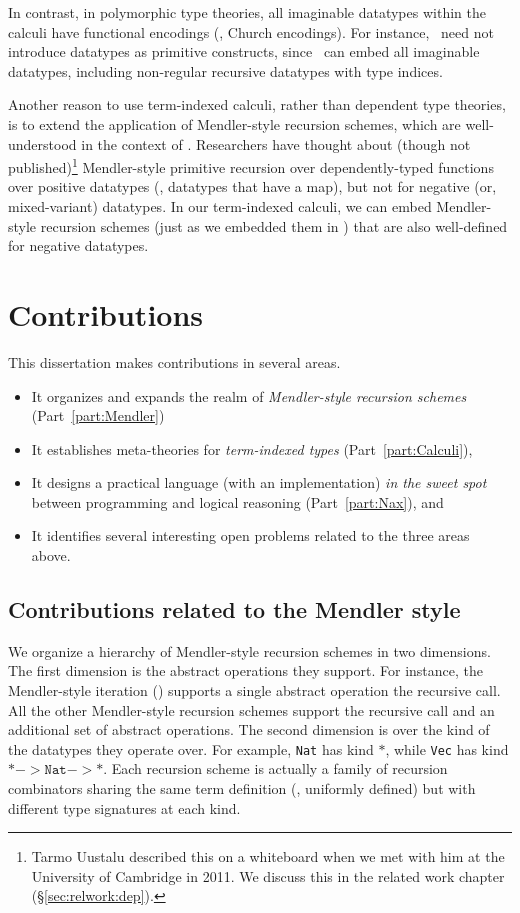 In contrast, in polymorphic type theories, all imaginable datatypes
within the calculi have functional encodings (\eg, Church encodings).
For instance, \Fw\ need not introduce datatypes as primitive constructs,
since \Fw\ can embed all imaginable datatypes, including non-regular
recursive datatypes with type indices. 

Another reason to use term-indexed calculi, rather than dependent type theories,
is to extend the application of Mendler-style recursion schemes,
which are well-understood in the context of \Fw.
Researchers have thought about (though not published)\footnote{
     Tarmo Uustalu described this on a whiteboard
     when we met with him at the University of Cambridge in 2011.
     We discuss this in the related work chapter (\S\ref{sec:relwork:dep}).}
Mendler-style primitive recursion over dependently-typed functions
over positive datatypes (\ie, datatypes that have a map), but not for
negative (or, mixed-variant) datatypes. In our term-indexed calculi,
we can embed Mendler-style recursion schemes (just as we embedded them in \Fw)
that are also well-defined for negative datatypes.

\section{Contributions}\label{sec:intro:contrib}
This dissertation makes contributions in several areas.
\begin{itemize}
\item[1.]
    It organizes and expands the realm of \emph{Mendler-style recursion schemes}
    (Part~\ref{part:Mendler})

\item[2.] It establishes meta-theories for \emph{term-indexed types}
        (Part~\ref{part:Calculi}),

\item[3.] It designs a practical language (with an implementation)
        \emph{in the sweet spot} between programming and logical reasoning
        (Part~\ref{part:Nax}), and

\item[4.] It identifies several interesting open problems related to the three areas above.
\end{itemize}

\subsection{Contributions related to the Mendler style}
We organize a hierarchy of Mendler-style recursion schemes in two dimensions.
The first dimension is the abstract operations they support. For instance,
the Mendler-style iteration (\MIt) supports a single abstract operation
the recursive call. All the other Mendler-style recursion schemes
support the recursive call and an additional set of abstract operations. 
The second dimension is over the kind of the datatypes they operate over.
For example, \texttt{Nat} has kind $*$, while \texttt{Vec}
has kind $* -> \mathtt{Nat} -> *$. Each recursion scheme is actually a
family of recursion combinators sharing the same term definition
(\ie, uniformly defined) but with different type signatures at each kind.

